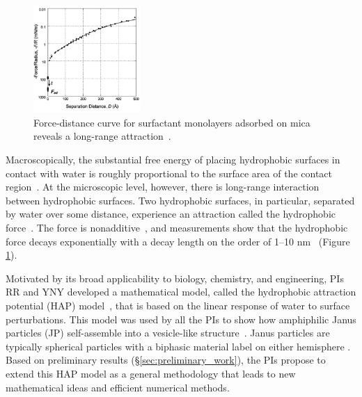 \begin{figure}
\vspace{-8pt}
\centerline
{
\includegraphics[width=0.36\textwidth]{figures/LongRangeForce.jpg}
}
\caption{\label{fig:force_distance}
Force-distance curve for surfactant
monolayers adsorbed on mica reveals a long-range
attraction~\cite{Lin2005}.}
\end{figure}

Macroscopically, the substantial free energy of placing hydrophobic
surfaces in contact with water is roughly proportional to the surface
area of the contact region~\cite{Bjorneholm2016}.
At the microscopic level, however, there is long-range interaction
between hydrophobic surfaces. Two hydrophobic surfaces, in particular,
separated by water over some distance, experience an attraction
called the
hydrophobic force~\cite{Lum1999, Meyer2006, Hammer2010, KaScScNe16}.
The force is nonadditive~\cite{SilveraBatista1242477},
and measurements show that the hydrophobic force decays exponentially with a
decay length on the order of 1--10 nm~
\cite{Israelachvili1984,Marcelja1977,Christenson2001,Lin2005,Taetal13}
(Figure \ref{fig:force_distance}).


Motivated by its broad applicability to biology, chemistry, and engineering,
PIs RR and YNY developed a mathematical model, called the
hydrophobic attraction potential (HAP) model~\cite{Fu2018_SIAM},
that is based on
the linear response of water to surface perturbations. This model was
used by all the PIs to show how amphiphilic Janus particles (JP)
self-assemble into a vesicle-like structure~\cite{FuQuRyYo20}.
Janus particles are typically spherical particles with a biphasic
material label on either hemisphere \cite{CaFaRaVe89,Gaetal13,Mallory2017,HaBr20,McBr21}.
Based on
preliminary results (\S\ref{sec:preliminary_work}), the PIs propose to
extend this HAP model as a general methodology that leads
to new mathematical ideas and efficient numerical methods.

